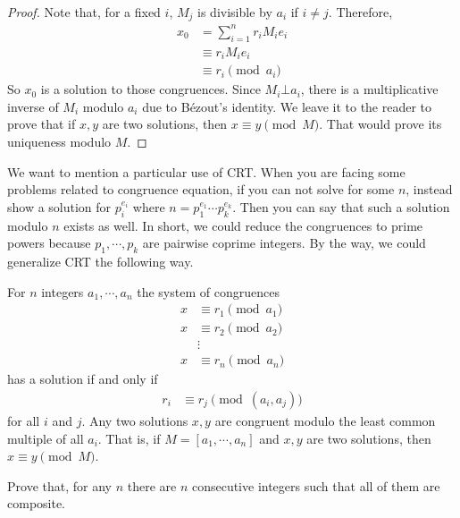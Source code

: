 \documentclass{subfile}
\begin{document}
		\begin{proof}
			Note that, for a fixed $i$, $M_j$ is divisible by $a_i$ if $i\neq j$. Therefore,
			\begin{align*}
			x_0
				& = \sum_{i=1}^{n} r_i M_ie_i\\
				& \equiv r_iM_ie_i\\
				& \equiv r_i\pmod{a_i}
			\end{align*}
			So $x_0$ is a solution to those congruences. Since $M_i\bot a_i$, there is a multiplicative inverse of $M_i$ modulo $a_i$ due to B\'{e}zout's identity. We leave it to the reader to prove that if $x,y$ are two solutions, then $x\equiv y\pmod M$. That would prove its uniqueness modulo $M$.
		\end{proof}
	We want to mention a particular use of CRT. When you are facing some problems related to congruence equation, if you can not solve for some $n$, instead show a solution for $p_i^{e_i}$ where $n=p_1^{e_1}\cdots p_k^{e_k}$. Then you can say that such a solution modulo $n$ exists as well. In short, we could reduce the congruences to prime powers because $p_1,\cdots,p_k$ are pairwise coprime integers. By the way, we could generalize CRT the following way.
		\begin{theorem}
			For $n$ integers $a_1,\cdots,a_n$ the system of congruences
			\begin{align*}
				x & \equiv r_1\pmod{a_1}\\
				x & \equiv r_2\pmod{a_2}\\
				&\vdots\\
				x & \equiv r_n\pmod{a_n}
			\end{align*}
			has a solution if and only if
			\begin{align*}
				r_i & \equiv r_j\pmod{(a_i,a_j)}
			\end{align*}
			for all $i$ and $j$. Any two solutions $x,y$ are congruent modulo the least common multiple of all $a_i$. That is, if $M=[a_1,\cdots,a_n]$ and $x,y$ are two solutions, then $x\equiv y\pmod M$.
		\end{theorem}

		\begin{problem}
			Prove that, for any $n$ there are $n$ consecutive integers such that all of them are composite.
		\end{problem}
\end{document}
